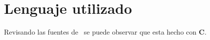 \section{Lenguaje utilizado}
  
  Revisando las fuentes de \vsftpd\ se puede observar que esta hecho con {\bf C}.

